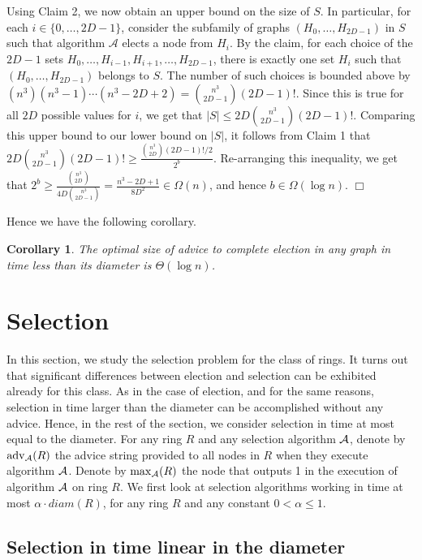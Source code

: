 \documentclass[11pt]{article}
\newtheorem{corollary}{Corollary}[section]
\newcommand{\qed}{\hfill $\Box$ \bigbreak}
\newenvironment{proof}{\noindent {\bf Proof.}}{\qed}
\newcommand{\algname}{\ensuremath{{\cal A}}}
\newcommand{\diam}[1]{\ensuremath{{diam}(#1)}}
\newcommand{\selected}[1]{\ensuremath{\mathrm{max}_{\cal A}(#1)}}
\newcommand{\advice}[1]{\ensuremath{\mathrm{adv}_{\algname}(#1)}}
\begin{document}
\begin{proof}
Using Claim 2, we now obtain an upper bound on the size of $S$. In particular, for each $i \in \{0,\ldots,2D-1\}$, consider the subfamily of graphs $(H_0,\ldots,H_{2D-1})$ in $S$ such that algorithm $\mathcal{A}$ elects a node from $H_i$. By the claim, for each choice of the $2D-1$ sets $H_0,\ldots,H_{i-1},H_{i+1},\ldots,H_{2D-1}$, there is exactly one set $H_i$ such that $(H_0,\ldots,H_{2D-1})$ belongs to $S$. The number of such choices is bounded above by $(n^3)(n^3-1) \cdots (n^3-2D+2) = \binom{n^3}{2D-1}(2D-1)!$. Since this is true for all $2D$ possible values for $i$, we get that $|S| \leq 2D\binom{n^3}{2D-1}(2D-1)!$. Comparing this upper bound to our lower bound on $|S|$, it follows from Claim 1 that $2D\binom{n^3}{2D-1}(2D-1)! \geq \frac{\binom{n^3}{2D}(2D-1)!/2}{2^b}$. Re-arranging this inequality, we get that $2^b \geq \frac{\binom{n^3}{2D}}{4D\binom{n^3}{2D-1}} = \frac{n^3-2D+1}{8D^2} \in \Omega(n)$, and hence $b\in \Omega(\log n)$.
\end{proof}

Hence we have the following corollary.

\begin{corollary}
The optimal size of advice to complete election in any graph in time less than its diameter is $\Theta (\log n)$.
\end{corollary}

 
\section{Selection}

In this section, we study the selection problem for the class of rings. It turns out that significant differences between election and selection can be exhibited
already for this class. As in the case of election, and for the same reasons, selection in time larger than the diameter can be accomplished without any advice. Hence, in the rest of the section, we consider selection in time at most equal to the diameter. 
For any ring $R$ and any selection algorithm $\algname$, denote by $\advice{R}$ the advice string provided to all nodes in $R$ when they execute algorithm $\algname$. Denote by $\selected{R}$ the node that outputs 1 in the execution of algorithm $\algname$ on ring $R$.
We first look at selection algorithms working in time at most $\alpha \cdot \diam{R}$, for any ring $R$ and any constant $0<\alpha \leq 1$.

\subsection{Selection in time linear in the diameter}
\end{document}
